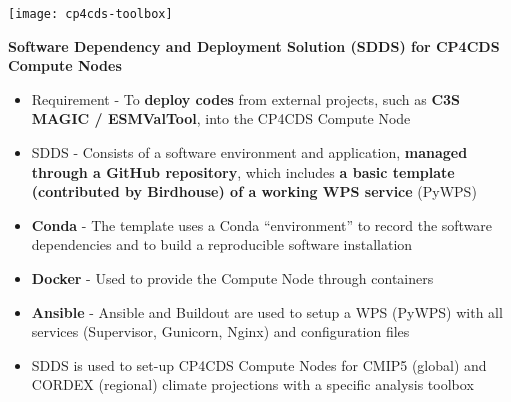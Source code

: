 \documentclass[portrait,a0paper,fontscale=0.4]{baposter} %
\newcommand{\compresslist}{%
\setlength{\itemsep}{1pt}%
\setlength{\parskip}{0pt}%
\setlength{\parsep}{0pt}%
}
\begin{document}
\begin{poster}
{%

  \begin{minipage}{0.4\textwidth}
    \texttt{[image: cp4cds-toolbox]}
  \end{minipage}
  \begin{minipage}{0.6\textwidth}
    {\bf Software Dependency and Deployment Solution (SDDS) for CP4CDS Compute Nodes}
    \begin{itemize}\compresslist
      \item Requirement - To {\bf deploy codes} from external projects,
        such as {\bf C3S MAGIC / ESMValTool}, into the CP4CDS Compute Node
      \item SDDS - Consists of a software environment and application, {\bf managed through a GitHub repository},
        which includes {\bf a basic template (contributed by Birdhouse) of a working WPS service} (PyWPS)
      \item {\bf Conda} -  The template uses a Conda ``environment'' to record the software dependencies
        and to build a reproducible software installation
      \item {\bf Docker} - Used to provide the Compute Node through containers
      \item {\bf Ansible} - Ansible and Buildout are used to setup a WPS (PyWPS) with all services
        (Supervisor, Gunicorn, Nginx) and configuration files
      \item SDDS is used to set-up CP4CDS Compute Nodes for CMIP5 (global) and CORDEX (regional) climate projections with
        a specific analysis toolbox
    \end{itemize}
  \end{minipage}

}
\end{poster}
\end{document}
